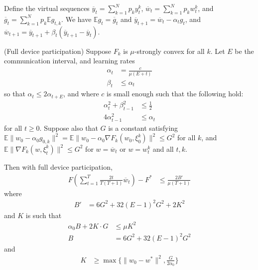 Define the virtual sequences $\overline{y}_{t}=\sum_{k=1}^{N}p_{k}y_{t}^{k}$,
$\overline{w}_{t}=\sum_{k=1}^{N}p_{k}w_{t}^{k}$, and $\overline{g}_{t}=\sum_{k=1}^{N}p_{k}\mathbb{E}g_{t,k}$.
We have $\mathbb{E}g_{t}=\overline{g}_{t}$ and $\overline{y}_{t+1}=\overline{w}_{t}-\alpha_{t}g_{t}$,
and $\overline{w}_{t+1}=\overline{y}_{t+1}+\beta_{t}(\overline{y}_{t+1}-\overline{y}_{t})$. 
\begin{thm}
	(Full device participation) Suppose $F_{k}$ is $\mu$-strongly convex
	for all $k$. Let $E$ be the communication interval, and learning
	rates 
	\begin{align*}
	\alpha_{t} & =\frac{c}{\mu(E+t)}\\
	\beta_{t} & \leq\alpha_{t}
	\end{align*}
	so that $\alpha_{t}\leq2\alpha_{t+E}$, and where $c$ is small enough
	such that the following hold: 
	\begin{align*}
	\alpha_{t}^{2}+\beta_{t-1}^{2} & \leq\frac{1}{2}\\
	4\alpha_{t-1}^{2} & \leq\alpha_{t}
	\end{align*}
	for all $t\geq0$. Suppose also that $G$ is a constant satisfying
	$\mathbb{E}\|w_{0}-\alpha_{0}g_{0,k}\|^{2}=\mathbb{E}\|w_{0}-\alpha_{0}\nabla F_{k}(w_{0},\xi_{0}^{k})\|^{2}\leq G^{2}$
	for all $k$, and $\mathbb{E}\|\nabla F_{k}(w,\xi_{t}^{k})\|^{2}\leq G^{2}$
	for $w=\overline{w}_{t}$ or $w=w_{t}^{k}$ and all $t,k$.
	
	Then with full device participation, \textbf{
		\begin{align*}
		F(\sum_{t=1}^{T}\frac{2t}{T(T+1)}\overline{w}_{t})-F^{\ast} & \leq\frac{2B'}{\mu(T+1)}
		\end{align*}
	} where
	\begin{align*}
	B' & =6G^{2}+32(E-1)^{2}G^{2}+2K^{2}
	\end{align*}
	and $K$ is such that 
	\begin{align*}
	\alpha_{0}B+2K\cdot G & \leq\mu K^{2}\\
	B & =6G^{2}+32(E-1)^{2}G^{2}
	\end{align*}
	and
	\begin{align*}
	K & \geq\max\{\|w_{0}-w^{\ast}\|^{2},\frac{G}{2\alpha_{0}}\}
	\end{align*}
\end{thm}
